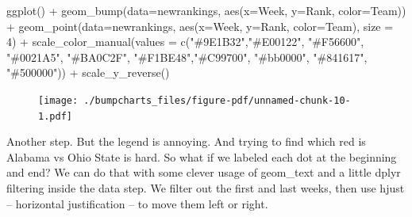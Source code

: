 \documentclass[
  letterpaper,
  DIV=11,
  numbers=noendperiod]{scrreprt}
\newenvironment{Shaded}{\begin{snugshade}}{\end{snugshade}}
\newcommand{\AttributeTok}[1]{\textcolor[rgb]{0.40,0.45,0.13}{#1}}
\newcommand{\DecValTok}[1]{\textcolor[rgb]{0.68,0.00,0.00}{#1}}
\newcommand{\FunctionTok}[1]{\textcolor[rgb]{0.28,0.35,0.67}{#1}}
\newcommand{\NormalTok}[1]{\textcolor[rgb]{0.00,0.23,0.31}{#1}}
\newcommand{\SpecialCharTok}[1]{\textcolor[rgb]{0.37,0.37,0.37}{#1}}
\newcommand{\StringTok}[1]{\textcolor[rgb]{0.13,0.47,0.30}{#1}}
\begin{document}
\begin{Shaded}
\begin{Highlighting}[]
\FunctionTok{ggplot}\NormalTok{() }\SpecialCharTok{+} 
  \FunctionTok{geom\_bump}\NormalTok{(}\AttributeTok{data=}\NormalTok{newrankings, }\FunctionTok{aes}\NormalTok{(}\AttributeTok{x=}\NormalTok{Week, }\AttributeTok{y=}\NormalTok{Rank, }\AttributeTok{color=}\NormalTok{Team)) }\SpecialCharTok{+} 
  \FunctionTok{geom\_point}\NormalTok{(}\AttributeTok{data=}\NormalTok{newrankings, }\FunctionTok{aes}\NormalTok{(}\AttributeTok{x=}\NormalTok{Week, }\AttributeTok{y=}\NormalTok{Rank, }\AttributeTok{color=}\NormalTok{Team), }\AttributeTok{size =} \DecValTok{4}\NormalTok{) }\SpecialCharTok{+} 
  \FunctionTok{scale\_color\_manual}\NormalTok{(}\AttributeTok{values =} \FunctionTok{c}\NormalTok{(}\StringTok{"\#9E1B32"}\NormalTok{,}\StringTok{"\#E00122"}\NormalTok{, }\StringTok{"\#F56600"}\NormalTok{, }\StringTok{"\#0021A5"}\NormalTok{, }\StringTok{"\#BA0C2F"}\NormalTok{, }\StringTok{"\#F1BE48"}\NormalTok{,}\StringTok{"\#C99700"}\NormalTok{, }\StringTok{"\#bb0000"}\NormalTok{, }\StringTok{"\#841617"}\NormalTok{, }\StringTok{"\#500000"}\NormalTok{)) }\SpecialCharTok{+}
  \FunctionTok{scale\_y\_reverse}\NormalTok{() }
\end{Highlighting}
\end{Shaded}

\begin{figure}[H]

{\centering \texttt{[image: ./bumpcharts\_files/figure-pdf/unnamed-chunk-10-1.pdf]}

}

\end{figure}

Another step. But the legend is annoying. And trying to find which red
is Alabama vs Ohio State is hard. So what if we labeled each dot at the
beginning and end? We can do that with some clever usage of geom\_text
and a little dplyr filtering inside the data step. We filter out the
first and last weeks, then use hjust -- horizontal justification -- to
move them left or right.
\end{document}
